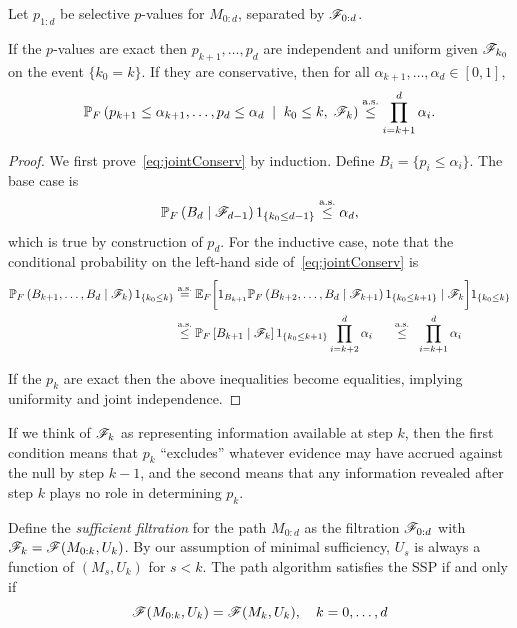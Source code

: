 \documentclass{article}
\begin{document}
\begin{proposition}\label{prop:jointConserv}

  Let $p_{1:d}$ be selective $p$-values for $M_{0:d}$, 
  separated by $\mathscr{F}_{0:d}$.

  If the $p$-values are exact then $p_{k+1}, \ldots, p_d$ are
  independent and uniform given $\mathscr{F}_{k_0}$ on the event $\{k_0=k\}$.
  If they are conservative, then for all
  $\alpha_{k+1},\ldots,\alpha_d \in [0,1]$,
  \begin{equation}\label{eq:jointConserv}
  \mathbb{P}_F\left(p_{k+1}\leq \alpha_{k+1}, \ldots, p_d \leq \alpha_d\;
    \mid\; k_0 \leq k, \; \mathscr{F}_k\right) \overset{\textrm{a.s.}}{\leq} \prod_{i=k+1}^d
  \alpha_i.
  \end{equation}
\end{proposition}

\begin{proof}
  We first prove~\eqref{eq:jointConserv}
  by induction. Define $B_i = \{p_i \leq \alpha_i\}$. 
  The base case is
  \[
  \mathbb{P}_F\left(B_d \mid \mathscr{F}_{d-1}\right)1_{\{k_0 \leq d-1\}} \overset{\textrm{a.s.}}{\leq} \alpha_d,
  \]
  which is true by construction of $p_d$. 
  For the inductive case, note that the
  conditional probability on the left-hand side
  of~\eqref{eq:jointConserv} is
  \begin{align*}
    \mathbb{P}_F\left(B_{k+1}, \ldots, B_d
      \mid \mathscr{F}_k\right)1_{\{k_0 \leq k\}} 
    &\overset{\textrm{a.s.}}{=} \mathbb{E}_F\bigg[ 1_{B_{k+1}} 
    \mathbb{P}_F\left(B_{k+2}, \ldots, B_d
      \mid \mathscr{F}_{k+1}\right)1_{\{k_0 \leq k+1\}}
    \mid \mathscr{F}_k\bigg]1_{\{k_0 \leq k\}}\\
    &\overset{\textrm{a.s.}}{\leq} \mathbb{P}_F\left[ B_{k+1}
      \mid \mathscr{F}_k\right]1_{\{k_0 \leq k+1\}}\prod_{i=k+2}^d \alpha_i
    \quad\;\;\overset{\textrm{a.s.}}{\leq}\;\; \prod_{i=k+1}^d \alpha_i
  \end{align*}

  If the $p_k$ are exact then the above 
  inequalities become equalities, implying uniformity and joint independence.
\end{proof}

If we think of $\mathscr{F}_k$ as representing information available at step $k$, then the first condition means that $p_k$ ``excludes'' whatever evidence may have accrued against the null by step $k-1$, and the second means that any information revealed after step $k$ plays no role in determining $p_k$.

Define the {\em sufficient filtration} for the path $M_{0:d}$ as the filtration $\mathscr{F}_{0:d}$ with $\mathscr{F}_k = \mathscr{F}(M_{0:k}, U_k)$. By our assumption of minimal sufficiency, $U_s$ is always a function of $(M_s, U_k)$ for $s<k$. The path algorithm satisfies the SSP if and only if
\begin{equation}\label{eq:SSP}
  \mathscr{F}(M_{0:k}, U_k) = \mathscr{F}(M_k, U_k), \quad k=0,\ldots, d
\end{equation}
\end{document}
